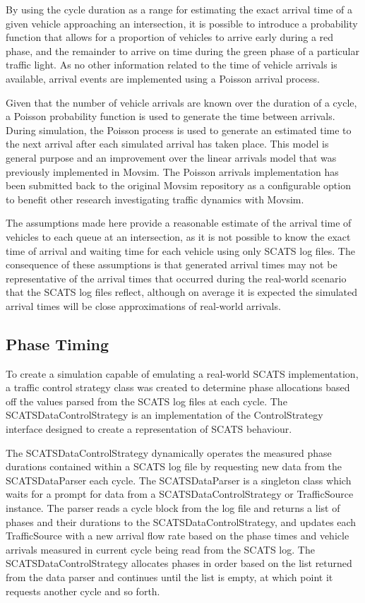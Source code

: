 By using the cycle duration as a range for estimating the exact arrival time of a given vehicle approaching an intersection, it is possible to introduce a probability function that allows for a proportion of vehicles to arrive early during a red phase, and the remainder to arrive on time during the green phase of a particular traffic light. As no other information related to the time of vehicle arrivals is available, arrival events are implemented using a Poisson arrival process. 

Given that the number of vehicle arrivals are known over the duration of a cycle, a Poisson probability function is used to generate the time between arrivals. During simulation, the Poisson process is used to generate an estimated time to the next arrival after each simulated arrival has taken place. This model is general purpose and an improvement over the linear arrivals model that was previously implemented in Movsim. The Poisson arrivals implementation has been submitted back to the original Movsim repository as a configurable option to benefit other research investigating traffic dynamics with Movsim. 

The assumptions made here provide a reasonable estimate of the arrival time of vehicles to each queue at an intersection, as it is not possible to know the exact time of arrival and waiting time for each vehicle using only SCATS log files. The consequence of these assumptions is that generated arrival times may not be representative of the arrival times that occurred during the real-world scenario that the SCATS log files reflect, although on average it is expected the simulated arrival times will be close approximations of real-world arrivals. 

\subsection{Phase Timing}


To create a simulation capable of emulating a real-world SCATS implementation, a traffic control strategy class was created to determine phase allocations based off the values parsed from the SCATS log files at each cycle. The SCATSDataControlStrategy is an implementation of the ControlStrategy interface designed to create a representation of SCATS behaviour.

The SCATSDataControlStrategy dynamically operates the measured phase durations contained within a SCATS log file by requesting new data from the SCATSDataParser each cycle. The SCATSDataParser is a singleton class which waits for a prompt for data from a SCATSDataControlStrategy or TrafficSource instance. The parser reads a cycle block from the log file and returns a list of phases and their durations to the SCATSDataControlStrategy, and updates each TrafficSource with a new arrival flow rate based on the phase times and vehicle arrivals measured in current cycle being read from the SCATS log. The SCATSDataControlStrategy allocates phases in order based on the list returned from the data parser and continues until the list is empty, at which point it requests another cycle and so forth.

